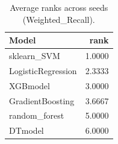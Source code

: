 \begin{table}[t]
\centering
\begin{tabular}{lr}
\toprule
Model & rank \\
\midrule
sklearn_SVM & 1.0000 \\
LogisticRegression & 2.3333 \\
XGBmodel & 3.0000 \\
GradientBoosting & 3.6667 \\
random_forest & 5.0000 \\
DTmodel & 6.0000 \\
\bottomrule
\end{tabular}
\caption{Average ranks across seeds (Weighted_Recall).}
\label{tab:avg_rank_Weighted_Recall}
\end{table}